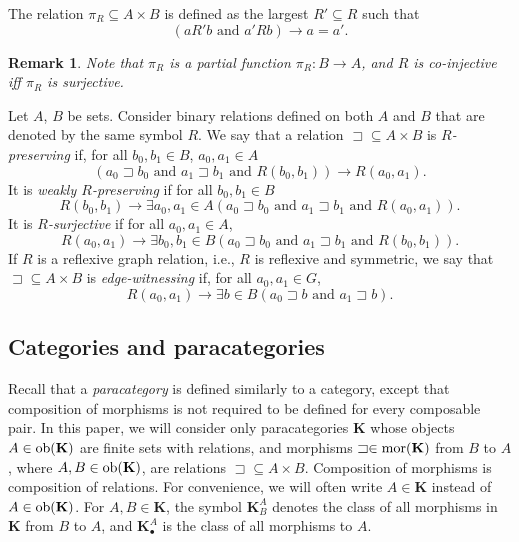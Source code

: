 \documentclass[12pt]{amsart}
\numberwithin{equation}{section}
\theoremstyle{plain}
\newtheorem{remark}[theorem]{\bf Remark}
\theoremstyle{definition}
\newcommand \sqsp{\sqsupset}
\newcommand \mor{{\rm{mor}}}
\newcommand \ob{{\rm{ob}}}
\newcommand \KKb{\mathbf{K}}
\begin{document}
The relation $\pi_R \subseteq A \times B$ is defined as the largest $R' \subseteq R$ such that  
%
$$ (a R' b \mbox{ and }  a'R b) \rightarrow a=a'.$$
%
\begin{remark}
Note that $\pi_R$ is a partial function $\pi_R: B \to A$, and $R$ is co-injective iff $\pi_R$ is surjective.
\end{remark}
%
Let $A$, $B$ be sets. Consider binary relations defined on both $A$ and $B$ that are denoted by the same symbol $R$. We say that a relation $\sqsp \subseteq A \times B$  is \emph{$R$-preserving} if, %
for all  $b_0, b_1 \in B$,  $a_0, a_1 \in A$
%
$$(a_0 \sqsp b_0 \mbox{ and } a_1 \sqsp b_1 \mbox{ and } R(b_0,b_1)) \rightarrow R(a_0,a_1).$$
%
It is \emph{weakly $R$-preserving} if
for all $ b_0, b_1 \in B$ 
%
$$R(b_0,b_1) \rightarrow \exists a_0, a_1 \in A (a_0 \sqsp b_0 \mbox{ and } a_1 \sqsp b_1 \mbox{ and } R(a_0,a_1)).$$
%
It is \emph{$R$-surjective} if for all $a_0, a_1 \in A$,
%
 $$R(a_0,a_1) \rightarrow \exists b_0, b_1 \in B (a_0 \sqsp b_0 \mbox{ and }  a_1 \sqsp b_1 \mbox{ and }  R(b_0,b_1)).$$ 
%
If $R$ is a reflexive graph relation, i.e., $R$ is reflexive and symmetric, we say that $\sqsp \subseteq A \times B$ is \emph{edge-witnessing} if, for all $a_0, a_1 \in G$, 
%
$$R(a_0, a_1) \rightarrow \exists b \in B (a_0 \sqsp b \mbox{ and } a_1 \sqsp b).$$ 


\subsection{Categories and paracategories}

Recall that a \emph{paracategory} is defined similarly to a category, except that composition of morphisms is not required to be defined for every composable pair. In this paper, we will consider only paracategories $\KKb$ whose objects $A \in \ob(\KKb)$ are finite sets with relations, and morphisms $\sqsp \in \mor(\KKb)$ from $B$ to $A$, where $A, B \in \ob(\KKb)$, are relations $\sqsp \subseteq A \times B$. Composition of morphisms is composition of relations. For convenience, we will often write $A \in \KKb$ instead of $A \in \ob(\KKb)$. For $A,B \in \KKb$, the symbol $\KKb^A_B$ denotes the class of all morphisms in $\KKb$ from $B$ to $A$, and $\KKb_\bullet^A$ is the class of all morphisms to $A$.
\end{document}
